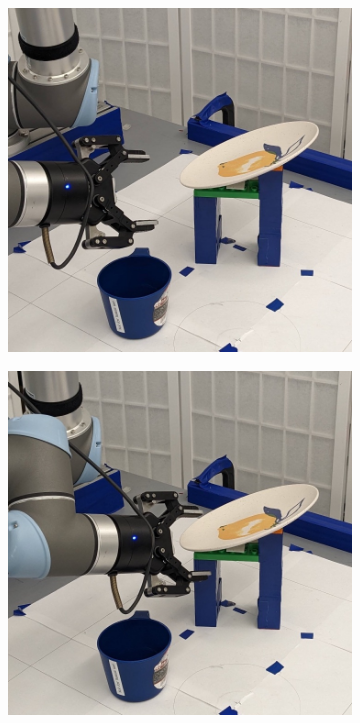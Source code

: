 \documentclass{article}
\begin{document}
\begin{figure}[]
\begin{subfigure}{(\linewidth - 0.05\linewidth)/5}
    \end{subfigure}
    \begin{subfigure}{(\linewidth - 0.05\linewidth)/5}
        \centering
        \includegraphics[width=\linewidth]{figures/episodes/bowl_on_mug/3.jpg}
    \end{subfigure}
    \begin{subfigure}{(\linewidth - 0.05\linewidth)/5}
        \centering
        \includegraphics[width=\linewidth]{figures/episodes/bowl_on_mug/4.jpg}

\end{subfigure}
\end{figure}
\end{document}
